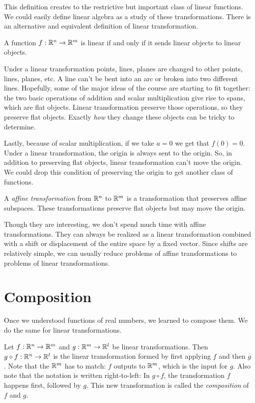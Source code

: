 \documentclass[fleqn]{report}
\begin{document}
This definition creates to the restrictive but important
class of linear functions. We could easily define linear
algebra as a study of these transformations. There is an
alternative and equivalent definition of linear
transformation.

\begin{prop}
A function $f: \mathbb{R}^n \rightarrow \mathbb{R}^m$ is linear if and only
if it sends linear objects to linear objects.
\end{prop}

Under a linear transformation points, lines, planes are changed
to other points, lines, planes, etc. A line can't be bent into
an arc or broken into two different lines. Hopefully, some
of the major ideas of the course are starting to fit together:
the two basic operations of addition and scalar multiplication
give rise to spans, which are flat objects. Linear
transformation preserve those operations, so they preserve
flat objects. Exactly \emph{how} they change these objects
can be tricky to determine.

Lastly, because of scalar multiplication, if we take $a
= 0$ we get that $f(0) = 0$. Under a linear transformation,
the origin is always sent to the origin. So, in addition to
preserving flat objects, linear transformation can't move the
origin. We could drop this condition of preserving the origin
to get another class of functions.

\begin{defn}
A \emph{affine transformation} from $\mathbb{R}^n$ to $\mathbb{R}^m$ is a
transformation that preserves affine subspaces. These
transformations preserve flat objects but may move the origin. 
\end{defn}

Though they are interesting, we don't spend much time with
affine transformations. They can always be realized as a linear
transformation combined with a shift or displacement of the
entire space by a fixed vector. Since shifts are relatively
simple, we can usually reduce problems of affine
transformations to problems of linear transformations.

\section{Composition}

Once we understood functions of real numbers, we learned to
compose them. We do the same for linear transformations.

\begin{defn}
Let $f : \mathbb{R}^n \rightarrow \mathbb{R}^m$ and $g: \mathbb{R}^m \rightarrow
\mathbb{R}^l$ be linear transformations. Then $g \circ f : \mathbb{R}^n
\rightarrow \mathbb{R}^l$ is the linear transformation formed by first
applying $f$ and then $g$. Note that the $\mathbb{R}^m$ has to match:
$f$ outputs to $\mathbb{R}^m$, which is the input for $g$. Also note
that the notation is written right-to-left: In $g \circ f$, the
transformation $f$ happens first, followed by $g$. This new
transformation is called the \emph{composition} of $f$ and $g$.
\end{defn}
\end{document}

